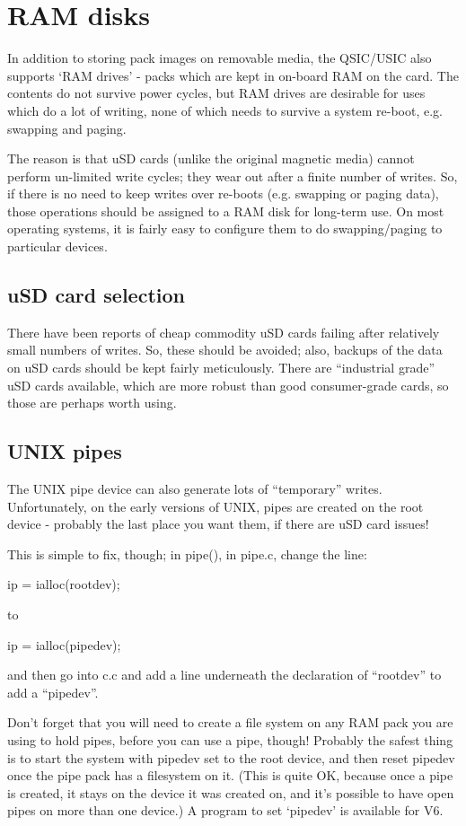 \section{RAM disks}

In addition to storing pack images on removable media, the QSIC/USIC also
supports `RAM drives' - packs which are kept in on-board RAM on the card. The
contents do not survive power cycles, but RAM drives are desirable for uses
which do a lot of writing, none of which needs to survive a system re-boot,
e.g. swapping and paging.

The reason is that uSD cards (unlike the original magnetic media) cannot
perform un-limited write cycles; they wear out after a finite number of
writes. So, if there is no need to keep writes over re-boots (e.g. swapping
or paging data), those operations should be assigned to a RAM disk for
long-term use. On most operating systems, it is fairly easy to configure them
to do swapping/paging to particular devices.

\subsection{uSD card selection}

There have been reports of cheap commodity uSD cards failing after relatively
small numbers of writes. So, these should be avoided; also, backups of the
data on uSD cards should be kept fairly meticulously. There are ``industrial
grade'' uSD cards available, which are more robust than good consumer-grade
cards, so those are perhaps worth using.

\subsection{UNIX pipes}

The UNIX pipe device can also generate lots of ``temporary'' writes.
Unfortunately, on the early versions of UNIX, pipes are created on the root
device - probably the last place you want them, if there are uSD card issues!

This is simple to fix, though; in pipe(), in pipe.c, change the line:

	ip = ialloc(rootdev);

to

	ip = ialloc(pipedev);

and then go into c.c and add a line underneath the declaration of ``rootdev''
to add a ``pipedev''.

Don't forget that you will need to create a file system on any RAM pack you
are using to hold pipes, before you can use a pipe, though! Probably the
safest thing is to start the system with pipedev set to the root device, and
then reset pipedev once the pipe pack has a filesystem on it. (This is quite
OK, because once a pipe is created, it stays on the device it was created on,
and it's possible to have open pipes on more than one device.) A program to
set `pipedev' is available for V6.

